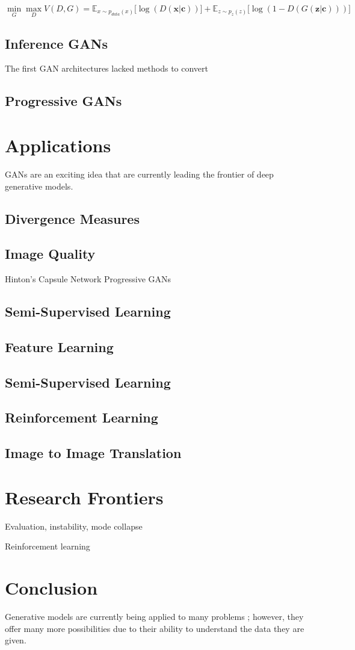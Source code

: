 \documentclass[11pt]{article}
\begin{document}
$$\min_{G}\max_{D}V(D, G) = \mathbb{E}_{x\sim p_{data}(x)}\Big[\log(D(\bm{x}|\bm{c}))\Big] + \mathbb{E}_{z\sim p_z(z)}\Big[\log(1-D(G(\bm{z}|\bm{c})))\Big]$$

\subsection{Inference GANs}
The first GAN architectures lacked methods to convert 

\subsection{Progressive GANs}

\section{Applications}
GANs are an exciting idea that are currently leading the frontier of deep generative models.
\subsection{Divergence Measures}
\subsection{Image Quality}
Hinton's Capsule Network
Progressive GANs
\subsection{Semi-Supervised Learning} \label{sec:semisupervised}
\subsection{Feature Learning}
\subsection{Semi-Supervised Learning}
\subsection{Reinforcement Learning}
\subsection{Image to Image Translation} \label{sec:img2img}


\section{Research Frontiers}
Evaluation, instability, mode collapse

Reinforcement learning

\section{Conclusion}
Generative models are currently being applied to many problems \citep{genmodelingopenai}; however, they offer many more possibilities due to their ability to understand the data they are given.



\end{document}
